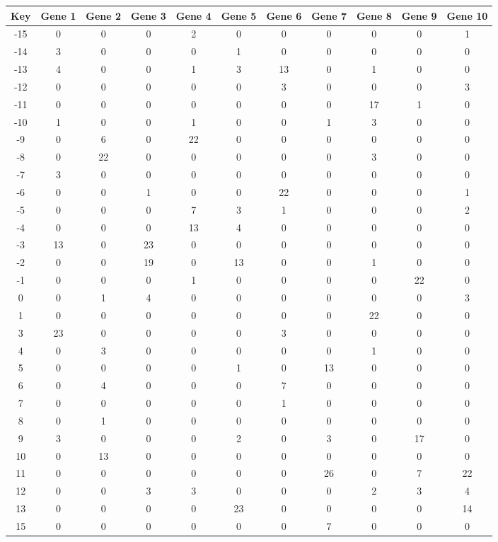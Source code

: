 \begin{tabular}{|c|c|c|c|c|c|c|c|c|c|c|}
\hline
Key & Gene 1 & Gene 2 & Gene 3 & Gene 4 & Gene 5 & Gene 6 & Gene 7 & Gene 8 & Gene 9 & Gene 10 \\
\hline
-15 & 0 & 0 & 0 & 2 & 0 & 0 & 0 & 0 & 0 & 1 \\
-14 & 3 & 0 & 0 & 0 & 1 & 0 & 0 & 0 & 0 & 0 \\
-13 & 4 & 0 & 0 & 1 & 3 & 13 & 0 & 1 & 0 & 0 \\
-12 & 0 & 0 & 0 & 0 & 0 & 3 & 0 & 0 & 0 & 3 \\
-11 & 0 & 0 & 0 & 0 & 0 & 0 & 0 & 17 & 1 & 0 \\
-10 & 1 & 0 & 0 & 1 & 0 & 0 & 1 & 3 & 0 & 0 \\
-9 & 0 & 6 & 0 & 22 & 0 & 0 & 0 & 0 & 0 & 0 \\
-8 & 0 & 22 & 0 & 0 & 0 & 0 & 0 & 3 & 0 & 0 \\
-7 & 3 & 0 & 0 & 0 & 0 & 0 & 0 & 0 & 0 & 0 \\
-6 & 0 & 0 & 1 & 0 & 0 & 22 & 0 & 0 & 0 & 1 \\
-5 & 0 & 0 & 0 & 7 & 3 & 1 & 0 & 0 & 0 & 2 \\
-4 & 0 & 0 & 0 & 13 & 4 & 0 & 0 & 0 & 0 & 0 \\
-3 & 13 & 0 & 23 & 0 & 0 & 0 & 0 & 0 & 0 & 0 \\
-2 & 0 & 0 & 19 & 0 & 13 & 0 & 0 & 1 & 0 & 0 \\
-1 & 0 & 0 & 0 & 1 & 0 & 0 & 0 & 0 & 22 & 0 \\
0 & 0 & 1 & 4 & 0 & 0 & 0 & 0 & 0 & 0 & 3 \\
1 & 0 & 0 & 0 & 0 & 0 & 0 & 0 & 22 & 0 & 0 \\
3 & 23 & 0 & 0 & 0 & 0 & 3 & 0 & 0 & 0 & 0 \\
4 & 0 & 3 & 0 & 0 & 0 & 0 & 0 & 1 & 0 & 0 \\
5 & 0 & 0 & 0 & 0 & 1 & 0 & 13 & 0 & 0 & 0 \\
6 & 0 & 4 & 0 & 0 & 0 & 7 & 0 & 0 & 0 & 0 \\
7 & 0 & 0 & 0 & 0 & 0 & 1 & 0 & 0 & 0 & 0 \\
8 & 0 & 1 & 0 & 0 & 0 & 0 & 0 & 0 & 0 & 0 \\
9 & 3 & 0 & 0 & 0 & 2 & 0 & 3 & 0 & 17 & 0 \\
10 & 0 & 13 & 0 & 0 & 0 & 0 & 0 & 0 & 0 & 0 \\
11 & 0 & 0 & 0 & 0 & 0 & 0 & 26 & 0 & 7 & 22 \\
12 & 0 & 0 & 3 & 3 & 0 & 0 & 0 & 2 & 3 & 4 \\
13 & 0 & 0 & 0 & 0 & 23 & 0 & 0 & 0 & 0 & 14 \\
15 & 0 & 0 & 0 & 0 & 0 & 0 & 7 & 0 & 0 & 0 \\
\hline
\end{tabular}